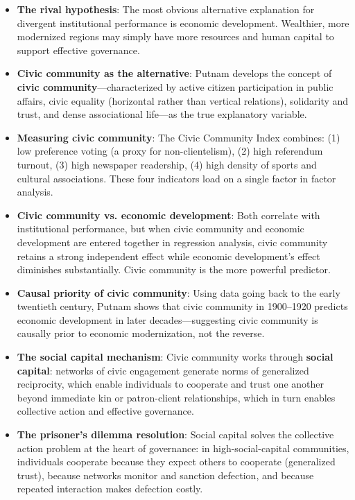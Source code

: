 \documentclass[12pt]{article}
\begin{document}
\begin{itemize}[leftmargin=*, itemsep=4pt]
    \item \textbf{The rival hypothesis}: The most obvious alternative explanation for divergent institutional performance is economic development. Wealthier, more modernized regions may simply have more resources and human capital to support effective governance.
    \item \textbf{Civic community as the alternative}: Putnam develops the concept of \textbf{civic community}---characterized by active citizen participation in public affairs, civic equality (horizontal rather than vertical relations), solidarity and trust, and dense associational life---as the true explanatory variable.
    \item \textbf{Measuring civic community}: The Civic Community Index combines: (1) low preference voting (a proxy for non-clientelism), (2) high referendum turnout, (3) high newspaper readership, (4) high density of sports and cultural associations. These four indicators load on a single factor in factor analysis.
    \item \textbf{Civic community vs. economic development}: Both correlate with institutional performance, but when civic community and economic development are entered together in regression analysis, civic community retains a strong independent effect while economic development's effect diminishes substantially. Civic community is the more powerful predictor.
    \item \textbf{Causal priority of civic community}: Using data going back to the early twentieth century, Putnam shows that civic community in 1900--1920 predicts economic development in later decades---suggesting civic community is causally prior to economic modernization, not the reverse.
    \item \textbf{The social capital mechanism}: Civic community works through \textbf{social capital}: networks of civic engagement generate norms of generalized reciprocity, which enable individuals to cooperate and trust one another beyond immediate kin or patron-client relationships, which in turn enables collective action and effective governance.
    \item \textbf{The prisoner's dilemma resolution}: Social capital solves the collective action problem at the heart of governance: in high-social-capital communities, individuals cooperate because they expect others to cooperate (generalized trust), because networks monitor and sanction defection, and because repeated interaction makes defection costly.
\end{itemize}
\end{document}
